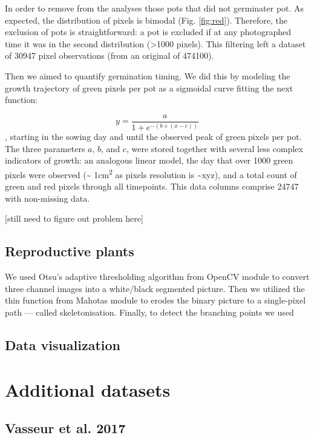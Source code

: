 \documentclass[12pt,]{article}
\begin{document}
In order to remove from the analyses those pots that did not germinater
pot. As expected, the distribution of pixels is bimodal (Fig.
\ref{fig:red}). Therefore, the exclusion of pots is straightforward: a
pot is excluded if at any photographed time it was in the second
distribution (\textgreater{}1000 pixels). This filtering left a dataset
of 30947 pixel observations (from an original of 474100).

Then we aimed to quantify germination timing. We did this by modeling
the growth trajectory of green pixels per pot as a sigmoidal curve
fitting the next function:

\[y = \frac{a}{1 + e^{-(b  \times  (x-c))} } \] , starting in the sowing
day and until the observed peak of green pixels per pot. The three
parameters \(a\), \(b\), and \(c\), were stored together with several
less complex indicators of growth: an analogous linear model, the day
that over 1000 green pixels were observed (\textasciitilde{}
1cm\textsuperscript{2} as pixels resolution is \textasciitilde{}xyz),
and a total count of green and red pixels through all timepoints. This
data columns comprise 24747 with non-missing data.

{[}still need to figure out problem here{]}

\subsection{Reproductive plants}\label{reproductive-plants}

We used Otsu's adaptive thresholding algorithm from OpenCV module to
convert three channel images into a white/black segmented picture. Then
we utilized the thin function from Mahotas module to erodes the binary
picture to a single-pixel path --- called skeletonisation. Finally, to
detect the branching points we used

\subsection{Data visualization}\label{data-visualization}

\section{Additional datasets}\label{additional-datasets}

\subsection{Vasseur et al. 2017}\label{vasseur-et-al.-2017}
\end{document}
